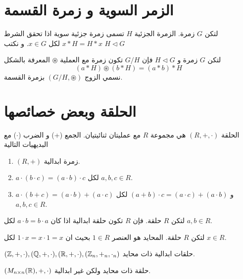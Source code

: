 \section{الزمر السوية و زمرة القسمة}

\begin{definition}
	لتكن $G$ زمرة. الزمرة الجزئية $H$ تسمى زمرة جزئية سوية اذا تحقق الشرط $x * H = H * x$ لكل $x\in G$. و نكتب $H \triangleleft G$
\end{definition}

\begin{definition}
	لتكن $G$ زمرة و $H \triangleleft G$ فإن $G/H$ تكون زمرة مع العملية $\circledast$ المعرفة بالشكل
	\[
	(a*H)\circledast(b*H) = (a*b)*H
	\]
	نسمي الزوج $(G/H, \circledast)$ بزمرة القسمة.
\end{definition}

\section{الحلقة وبعض خصائصها}

\begin{definition}
	الحلقة $(R, +, \cdot)$ هي مجموعة $R$ مع عمليتان ثنائيتيان. الجمع (+) و الضرب ($\cdot$) مع البديهيات التالية
	\begin{enumerate}
		\item $(R, +)$ زمرة ابدالية.
		\item $a\cdot(b\cdot c) = (a\cdot b)\cdot c$ لكل $a, b, c\in R$.
		\item $a\cdot(b+c) = (a\cdot b) + (a\cdot c)$ و $(a+b)\cdot c = (a\cdot c) + (a\cdot b)$ لكل $a, b, c\in R$. 
	\end{enumerate}
\end{definition}

\begin{definition}
	لتكن $R$ حلقة. فإن $R$ تكون حلقة ابدالية اذا كان $a\cdot b = b\cdot a$ لكل $a, b\in R$.
\end{definition} 

\begin{definition}
	لتكن $R$ حلقة. المحايد هو العنصر $1\in R$ بحيث ان $1\cdot x= x\cdot1=x$ لكل $x\in R$.
\end{definition}

\begin{example}
	$(\mathbb{Z}, +, \cdot), (\mathbb{Q}, +, \cdot), (\mathbb{R}, +, \cdot), (\mathbb{Z}_n, +_n, \cdot_n)$ حلقات ابدالية ذات محايد.
\end{example}

\begin{example}
	$(M_{n\times n}(\mathbb{R}), +, \cdot)$ حلقة ذات محايد ولكن غير ابدالية.
\end{example}
